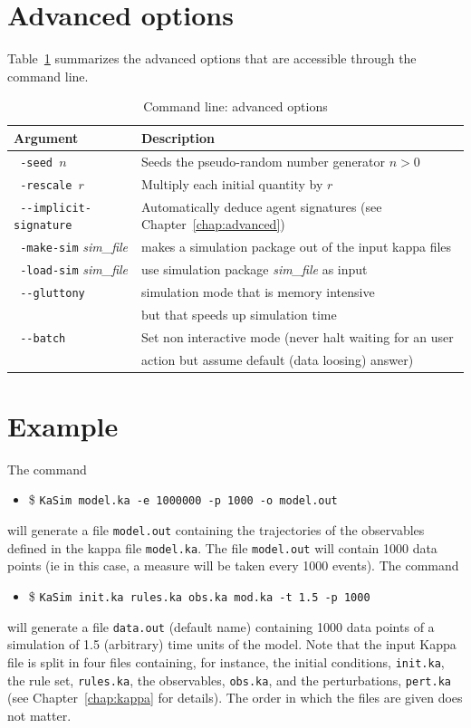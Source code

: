 \documentclass[11pt]{book}
\def\ttt#1{\texttt{#1}}
\def\ie{ie }
\def\ITE#1{\begin{itemize}#1\end{itemize}}
\def\dd{-\hspace{0.001cm}-}
\begin{document}
\section{Advanced options}

Table~\ref{tab:add-options} summarizes the advanced options that are accessible through the command line.

\begin{table}[h!]
\caption{Command line: advanced options}
\centering
\begin{tabular}{|l|l|}
\hline 
Argument & Description \\ \hline
\ttt{ -seed $n$} & Seeds the pseudo-random number generator $n>0$ \\
\ttt{ -rescale $r$} & Multiply each initial quantity by $r$ \\
\ttt{ \dd implicit-signature} & Automatically deduce agent signature\index{agent signature}s (see Chapter~\ref{chap:advanced})\\
\ttt{ -make-sim} \textit{sim\_file} & makes a simulation package out of the input kappa files \\
\ttt{ -load-sim} \textit{sim\_file} & use simulation package \textit{sim\_file} as input\\
\ttt{ \dd gluttony} & simulation mode that is memory intensive \\ & but that speeds up simulation time\\
\ttt{ \dd batch} & Set non interactive mode (never halt waiting for an user\\
& action but assume default (data loosing) answer)\\
\hline
\end{tabular}
\label{tab:add-options}
\end{table}%
%

\section{Example}
The command 
\ITE{
\item[\$] \ttt{KaSim model.ka -e 1000000 -p 1000 -o model.out}  
}
will generate a file \ttt{model.out} containing the trajectories of the observables defined in the kappa file \ttt{model.ka}. The file \ttt{model.out} will contain 1000 data points (\ie in this case, a measure will be taken every 1000 events). The command
\ITE{
\item[\$] \ttt{KaSim init.ka rules.ka obs.ka mod.ka -t 1.5 -p 1000}  
}
will generate a file \ttt{data.out} (default name) containing 1000 data points of a simulation of 1.5 (arbitrary) time units of the model. Note that the input Kappa file is split in four files containing, for instance, the initial conditions, \ttt{init.ka}, the rule set, \ttt{rules.ka}, the observables, \ttt{obs.ka}, and the perturbations, \ttt{pert.ka} (see Chapter~\ref{chap:kappa} for details). The order in which the files are given does not matter.
\end{document}
